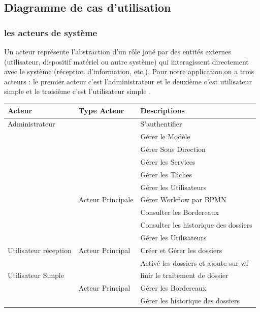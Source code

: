  
 
 
 
 
 
 
 
 
 
\subsection{ Diagramme de cas d’utilisation }
 
  \subsubsection{ les acteurs de système  }
 
 Un acteur représente l'abstraction d'un rôle joué par des entités externes (utilisateur, dispositif matériel ou autre système) qui interagissent directement avec le système (réception d’information, etc.). Pour notre application,on a trois acteurs : le premier acteur c'est l'administrateur et le deuxième  c'est utilisateur simple  et le troisième c'est l'utilisateur simple .
 
\begin{table}[H]
	\begin{tabular}{|l|l|l|}
		\hline
		\multicolumn{1}{|l|}{Acteur} & Type Acteur & Descriptions \\ \hline
	Administrateur	 &  & S’authentifier \\ \cline{3-3} 
		&  & Gérer le Modèle \\ \cline{3-3} 
		&  & Gérer Sous Direction \\ \cline{3-3} 
	 	&  & Gérer les Services \\ \cline{3-3} 	
	 	&  & Gérer les Tâches \\ \cline{3-3} 
		&  & Gérer les Utilisateurs \\ \cline{3-3} 
		& Acteur Principale & Gérer Workflow par BPMN  \\ \cline{3-3} 
				&  & Consulter les Bordereaux  \\ \cline{3-3} 
						&  &Consulter les historique des dossiers\\ \cline{3-3} 
								&  & Gérer les Utilisateurs \\ \hline 
		
  
			Utilisateur réception	 	&Acteur Principal & Créer et Gérer les dossiers  \\ \cline{3-3}  
		&  & Activé les dossiers et ajoute sur wf \\ \hline
 
		Utilisateur Simple	&  & finir le traitement de dossier  \\ \cline{3-3} 
		&  Acteur Principal& Gérer les Bordereaux  \\ \cline{3-3} 
		&  &Gérer les historique des dossiers\\ \hline 
	\end{tabular}
\end{table}
 
